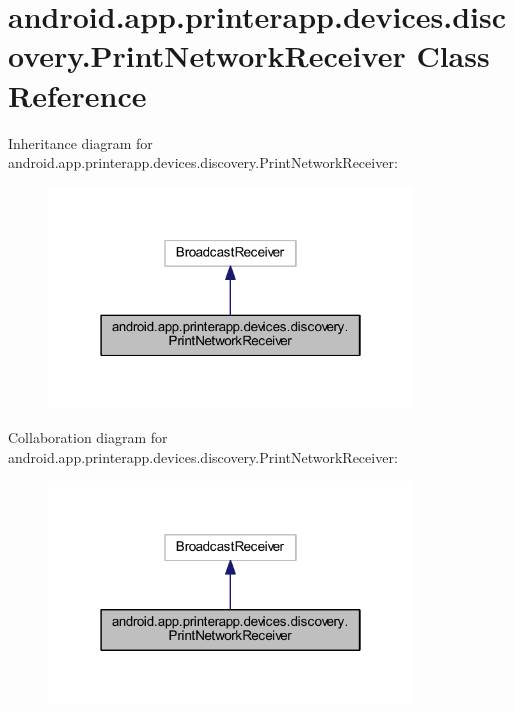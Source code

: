 \hypertarget{classandroid_1_1app_1_1printerapp_1_1devices_1_1discovery_1_1_print_network_receiver}{}\section{android.\+app.\+printerapp.\+devices.\+discovery.\+Print\+Network\+Receiver Class Reference}
\label{classandroid_1_1app_1_1printerapp_1_1devices_1_1discovery_1_1_print_network_receiver}


Inheritance diagram for android.\+app.\+printerapp.\+devices.\+discovery.\+Print\+Network\+Receiver\+:
\nopagebreak
\begin{figure}[H]
\begin{center}
\leavevmode
\includegraphics[width=274pt]{classandroid_1_1app_1_1printerapp_1_1devices_1_1discovery_1_1_print_network_receiver__inherit__graph}
\end{center}
\end{figure}


Collaboration diagram for android.\+app.\+printerapp.\+devices.\+discovery.\+Print\+Network\+Receiver\+:
\nopagebreak
\begin{figure}[H]
\begin{center}
\leavevmode
\includegraphics[width=274pt]{classandroid_1_1app_1_1printerapp_1_1devices_1_1discovery_1_1_print_network_receiver__coll__graph}
\end{center}
\end{figure}
